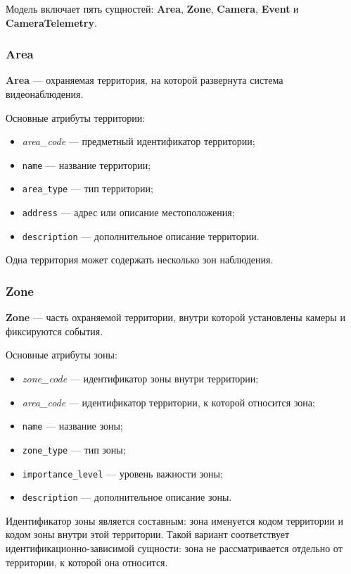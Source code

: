 Модель включает пять сущностей: \textbf{Area}, \textbf{Zone},
\textbf{Camera}, \textbf{Event} и \textbf{CameraTelemetry}.

\subsubsection{Area}

\textbf{Area} --- охраняемая территория, на которой развернута система
видеонаблюдения.

Основные атрибуты территории:

\begin{itemize}
  \item \emph{area\_code} --- предметный идентификатор территории;
  \item \texttt{name} --- название территории;
  \item \texttt{area\_type} --- тип территории;
  \item \texttt{address} --- адрес или описание местоположения;
  \item \texttt{description} --- дополнительное описание территории.
\end{itemize}

Одна территория может содержать несколько зон наблюдения.

\subsubsection{Zone}

\textbf{Zone} --- часть охраняемой территории, внутри которой установлены
камеры и фиксируются события.

Основные атрибуты зоны:

\begin{itemize}
  \item \emph{zone\_code} --- идентификатор зоны внутри территории;
  \item \emph{area\_code} --- идентификатор территории, к которой относится
        зона;
  \item \texttt{name} --- название зоны;
  \item \texttt{zone\_type} --- тип зоны;
  \item \texttt{importance\_level} --- уровень важности зоны;
  \item \texttt{description} --- дополнительное описание зоны.
\end{itemize}

Идентификатор зоны является составным: зона именуется кодом территории и
кодом зоны внутри этой территории. Такой вариант соответствует
идентификационно-зависимой сущности: зона не рассматривается отдельно от
территории, к которой она относится.

